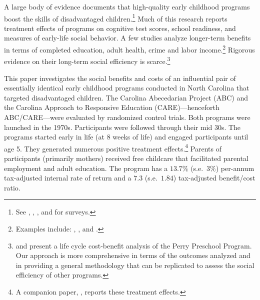 \noindent A large body of evidence documents that high-quality early childhood programs boost the skills of disadvantaged children.\footnote{See \citet{Cunha_Heckman_ea_2006_HEE}, \citet{Almond-Currie_2011_JEP}, \citet{Duncan_Magnuson_2013_JEP}, and \citet{Elango_Hojman_etal_2016_Early-Edu} for surveys.} Much of this research reports treatment effects of programs on cognitive test scores, school readiness, and measures of early-life social behavior. A few studies analyze longer-term benefits in terms of completed education, adult health, crime and labor income.\footnote{Examples include: \citet{Heckman_Moon_etal_2010_QE}, \citet{Havnes_Mogstad_2011_AEJEP}, and \citet{Campbell_Conti_etal_2014_EarlyChildhoodInvestments}.} Rigorous evidence on their long-term social efficiency is scarce.\footnote{\citet{Belfield_Nores_etal_2006_JHR} and \citet{Heckman_Moon_etal_2010_RateofReturn} present a life cycle cost-benefit analysis of the Perry Preschool Program. Our approach is more comprehensive in terms of the outcomes analyzed and in providing a general methodology that can be replicated to assess the social efficiency of other programs.}

This paper investigates the social benefits and costs of an influential pair of essentially identical early childhood programs conducted in North Carolina that targeted disadvantaged children. The Carolina Abecedarian Project (ABC) and the Carolina Approach to Responsive Education (CARE)---henceforth ABC/CARE---were evaluated by randomized control trials. Both programs were launched in the 1970s. Participants were followed through their mid 30s. The programs started early in life (at 8 weeks of life) and engaged participants until age 5. They generated numerous positive treatment effects.\footnote{A companion paper, \citet{Garcia_Heckman_Ziff_2018_EER}, reports these treatment effects.} Parents of participants (primarily mothers) received free childcare that facilitated parental employment and adult education. The program has a $13.7\%$ (s.e.\ $3\%$) per-annum tax-adjusted internal rate of return and a $7.3$ (s.e.\ $1.84$) tax-adjusted benefit/cost ratio.

